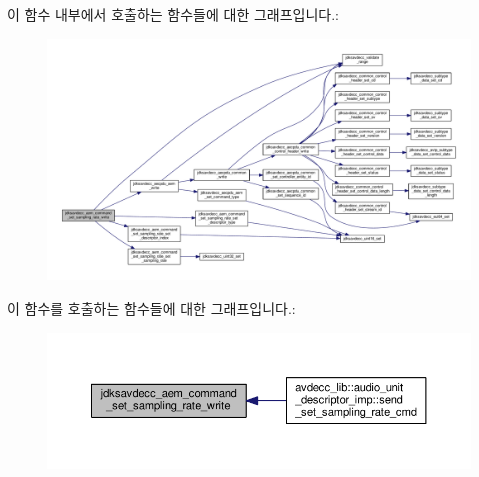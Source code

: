 이 함수 내부에서 호출하는 함수들에 대한 그래프입니다.\+:
\nopagebreak
\begin{figure}[H]
\begin{center}
\leavevmode
\includegraphics[width=350pt]{group__command__set__sampling__rate_gac9594b53d8732b74a34380328a482323_cgraph}
\end{center}
\end{figure}




이 함수를 호출하는 함수들에 대한 그래프입니다.\+:
\nopagebreak
\begin{figure}[H]
\begin{center}
\leavevmode
\includegraphics[width=350pt]{group__command__set__sampling__rate_gac9594b53d8732b74a34380328a482323_icgraph}
\end{center}
\end{figure}


